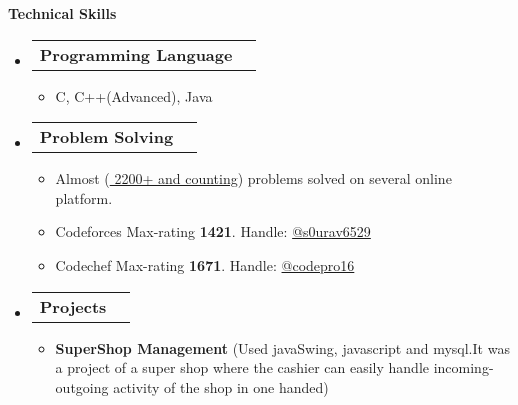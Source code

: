 \documentclass[legalpaper,10pt]{article}
\makeatletter
\newcommand{\resheading}[1]{{\large \colorbox{mygrey}{\begin{minipage}{\textwidth}{\textbf{#1 \vphantom{p\^{E}}}}\end{minipage}}}}
\newcommand{\ressubheading}[4]{
	\begin{tabular*}{7.1in}{l@{\extracolsep{\fill}}r}
		\textbf{#1} & \textit{#4} \\
	\end{tabular*}\vspace{-6pt}}
\makeatother
\begin{document}
	\resheading{Technical Skills}
        \begin{itemize}  

            \item \ressubheading{Programming Language}{}{}{}
		\begin{itemize}
			\item C, C++(Advanced), Java
		\end{itemize}

            \item \ressubheading{Problem Solving}{}{}{}
		\begin{itemize}
                \item Almost (\href{https://www.stopstalk.com/user/profile/ovebepari}{ 2200+ and  counting}) problems solved on several online platform.
			\item Codeforces Max-rating \textbf{1421}. Handle:           \href{https://codeforces.com/profile/s0urav6529}{@s0urav6529} 
                \item Codechef Max-rating \textbf{1671}. Handle: \href{https://www.codechef.com/users/codepro16}{@codepro16} 
		\end{itemize}

            \item \ressubheading{Projects}{}{}{}
		\begin{itemize}
                \item \textbf{SuperShop Management} (Used javaSwing, javascript and mysql.It was a project of a super shop where the cashier can easily handle incoming-outgoing activity of the shop in one handed)
		\end{itemize}
	\end{itemize}

	\vspace{0.15in}
\end{document}
